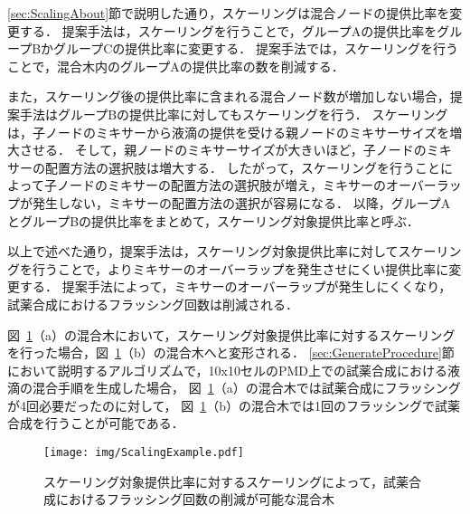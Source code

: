 \ref{sec:ScalingAbout}節で説明した通り，スケーリングは混合ノードの提供比率を変更する．
提案手法は，スケーリングを行うことで，グループAの提供比率をグループBかグループCの提供比率に変更する．
提案手法では，スケーリングを行うことで，混合木内のグループAの提供比率の数を削減する．

また，スケーリング後の提供比率に含まれる混合ノード数が増加しない場合，提案手法はグループBの提供比率に対してもスケーリングを行う．
スケーリングは，子ノードのミキサーから液滴の提供を受ける親ノードのミキサーサイズを増大させる．
そして，親ノードのミキサーサイズが大きいほど，子ノードのミキサーの配置方法の選択肢は増大する．
したがって，スケーリングを行うことによって子ノードのミキサーの配置方法の選択肢が増え，ミキサーのオーバーラップが発生しない，ミキサーの配置方法の選択が容易になる．
以降，グループAとグループBの提供比率をまとめて，スケーリング対象提供比率と呼ぶ．

以上で述べた通り，提案手法は，スケーリング対象提供比率に対してスケーリングを行うことで，よりミキサーのオーバーラップを発生させにくい提供比率に変更する．
提案手法によって，ミキサーのオーバーラップが発生しにくくなり，試薬合成におけるフラッシング回数は削減される．

図~\ref{fig:ScalingAllTargetRatio}（a）の混合木において，スケーリング対象提供比率に対するスケーリングを行った場合，図~\ref{fig:ScalingAllTargetRatio}（b）の混合木へと変形される．
\ref{sec:GenerateProcedure}節において説明するアルゴリズムで，10x10セルのPMD上での試薬合成における液滴の混合手順を生成した場合，
図~\ref{fig:ScalingAllTargetRatio}（a）の混合木では試薬合成にフラッシングが4回必要だったのに対して，
図~\ref{fig:ScalingAllTargetRatio}（b）の混合木では1回のフラッシングで試薬合成を行うことが可能である．


\begin{figure}[tbp]
    \centering\texttt{[image: img/ScalingExample.pdf]}
 \caption{スケーリング対象提供比率に対するスケーリングによって，試薬合成におけるフラッシング回数の削減が可能な混合木}\label{fig:ScalingAllTargetRatio}
\end{figure}



